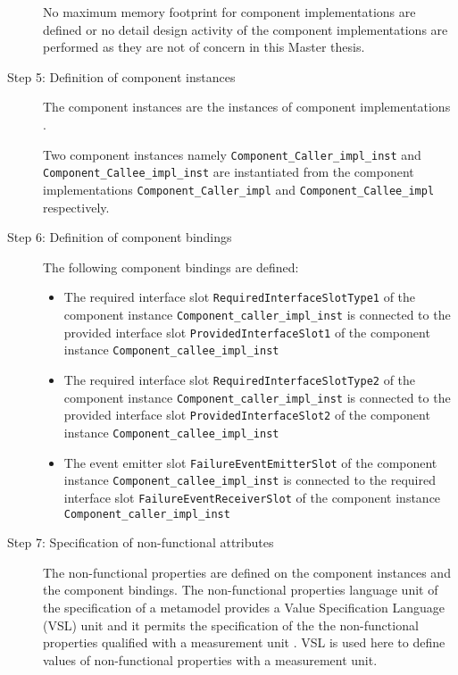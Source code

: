 \begin{description}
No maximum memory footprint for component implementations are defined or no detail design activity of the component implementations are performed as they are not of concern in this Master thesis.

\item [Step 5: Definition of component instances] The component instances are the instances of component implementations \cite{CompBasedProcess}.

Two component instances namely \texttt{Component\allowbreak\_Caller\_impl\_inst} and \texttt{Component\allowbreak\_Callee\_impl\_inst} are instantiated from the component implementations \texttt{Component\allowbreak\_Caller\_impl} and \texttt{Component\allowbreak\_Callee\_impl} respectively. 

\item [Step 6: Definition of component bindings] The following component bindings are defined:

\begin{itemize}
\item The required interface slot \texttt{RequiredInterface\allowbreak SlotType1} of the component instance \texttt{Component\allowbreak\_caller\_impl\_inst} is connected to the provided interface slot \texttt{ProvidedInterface\allowbreak Slot1} of the component instance \texttt{Component\allowbreak\_callee\_impl\_inst}
\item The required interface slot \texttt{RequiredInterface\allowbreak SlotType2} of the component instance \texttt{Component\allowbreak\_caller\_impl\_inst} is connected to the provided interface slot \texttt{ProvidedInterface\allowbreak Slot2} of the component instance \texttt{Component\allowbreak\_callee\_impl\_inst}
\item The event emitter slot \texttt{FailureEvent\allowbreak EmitterSlot} of the component instance \texttt{Component\allowbreak\_callee\_impl\_inst} is connected to the required interface slot \texttt{FailureEvent\allowbreak ReceiverSlot} of the component instance \texttt{Component\allowbreak\_caller\_impl\_inst}
\end{itemize}

\item [Step 7: Specification of non-functional attributes] The non-functional properties are defined on the component instances and the component bindings. The non-functional properties language unit of the specification of a metamodel provides a Value Specification Language (VSL) unit and it permits the specification of the the non-functional properties qualified with a measurement unit \cite{SpecMetamodel}. VSL is used here to define values of non-functional properties with a measurement unit. 


\end{description}
